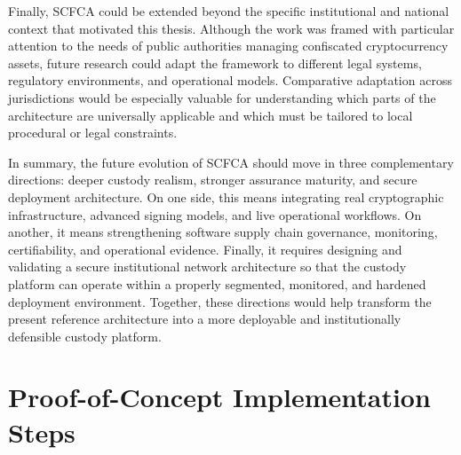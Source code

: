 \documentclass[12pt,a4paper]{report}
\begin{document}
Finally, SCFCA could be extended beyond the specific institutional and national context that motivated this thesis. Although the work was framed with particular attention to the needs of public authorities managing confiscated cryptocurrency assets, future research could adapt the framework to different legal systems, regulatory environments, and operational models. Comparative adaptation across jurisdictions would be especially valuable for understanding which parts of the architecture are universally applicable and which must be tailored to local procedural or legal constraints.

In summary, the future evolution of SCFCA should move in three complementary directions: deeper custody realism, stronger assurance maturity, and secure deployment architecture. On one side, this means integrating real cryptographic infrastructure, advanced signing models, and live operational workflows. On another, it means strengthening software supply chain governance, monitoring, certifiability, and operational evidence. Finally, it requires designing and validating a secure institutional network architecture so that the custody platform can operate within a properly segmented, monitored, and hardened deployment environment. Together, these directions would help transform the present reference architecture into a more deployable and institutionally defensible custody platform.


\printbibliography


\appendix

\chapter{Proof-of-Concept Implementation Steps}
\begingroup
\footnotesize
\setlength{\tabcolsep}{5pt}
\setlength{\extrarowheight}{5pt}
\renewcommand{\arraystretch}{1.45}
\end{document}
